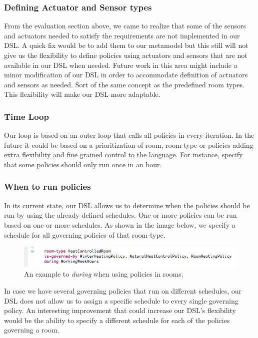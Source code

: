 \documentclass{llncs}
\begin{document}
\subsubsection{Defining Actuator and Sensor types}\label{subsec:def-sensor-actuator-types}
From the evaluation section above, we came to realize that some of the sensors and actuators needed to satisfy the requirements are not implemented in our DSL. A quick fix would be to add them to our metamodel but this still will not give us the flexibility to define policies using actuators and sensors that are not available in our DSL when needed. Future work in this area might include a minor modification of our DSL in order to accommodate definition of actuators and sensors as needed. Sort of the same concept as the predefined room types. This flexibility will make our DSL more adaptable.


\subsubsection{Time Loop}\label{subsec:looptime}
Our loop is based on an outer loop that calls all policies in every iteration. In the future it could be based on a prioritization of room, room-type or policies adding extra flexibility and fine grained control to the language. For instance, specify that some policies should only run once in an hour.

\subsubsection{When to run policies}\label{subsec:during}
In its current state, our DSL allows us to determine when the policies should be run by using the already defined schedules. One or more policies can be run based on one or more schedules. As shown in the image below, we specify a schedule for all governing policies of that room-type. 
\begin{figure}
  \centering
    \includegraphics[scale=0.5]{dsl-during.png} 
	\caption{An example to \textit{during} when using policies in rooms.}
	\label{fig:during}
\end{figure}
In case we have several governing policies that run on different schedules, our DSL does not allow us to assign a specific schedule to every single governing policy. An interesting improvement that could increase our DSL's flexibility would be the ability to specify a different schedule for each of the policies governing a room. 
\end{document}
